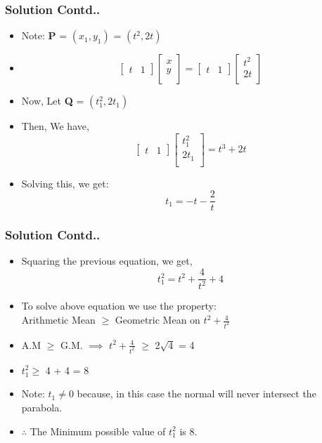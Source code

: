 \documentclass[12pt]{beamer}
\begin{document}
\begin{frame}
\frametitle{Solution Contd..}
\begin{itemize}
\item<1-5> Note: \textbf{P} = $( x_1, y_1 )$ = $( t^2, 2t )$
\item<2-5>
\[
\begin{bmatrix}
    t & 1  
\end{bmatrix}
\begin{bmatrix}
    x\\
    y\\  
\end{bmatrix} = 
\begin{bmatrix}
    t & 1  
\end{bmatrix}
\begin{bmatrix}
    t^2\\
    2t\\  
\end{bmatrix}
\]
\item<3-5> Now, Let \textbf{Q} = $( t_1^2, 2t_1 )$
\item<4-5> Then, We have,
\[
\begin{bmatrix}
    t & 1  
\end{bmatrix}
\begin{bmatrix}
    t_1^2\\
    2t_1\\  
\end{bmatrix} = 
t^3 + 2t
\]
\item<5> Solving this, we get:
\[
t_1 = -t - \frac{2}{t}
\]
\end{itemize}
\end{frame}



\begin{frame}
\frametitle{Solution Contd..}
\begin{itemize}
\item<1-6>
Squaring the previous equation, we get,
\[
t_1^2 = t^2 + \frac{4}{t^2} + 4
\]
\item<2-6> To solve above equation we use the property:\\
Arithmetic Mean $\geq$ Geometric Mean on $t^2 + \frac{4}{t^2}$
\item<3-6> A.M $\geq$ G.M. $\implies$ $t^2 + \frac{4}{t^2}$ $\geq$ 2$\sqrt{4}$ = 4
\item<4-6> $t_1^2 \geq$ 4 + 4 = 8
\item<5-6> Note: $t_1 \neq 0$ because, in this case the normal will never intersect the parabola.
\item<6> $\therefore$ The Minimum possible value of $t_1^2$ is 8.
\end{itemize}
\end{frame}
\end{document}
